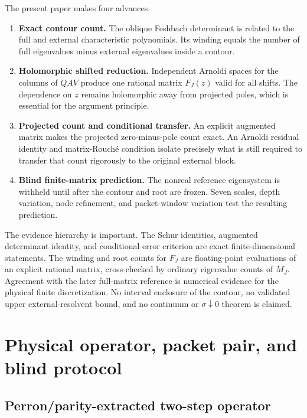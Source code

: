 \documentclass[11pt]{article}
\theoremstyle{definition}
\theoremstyle{remark}
\begin{document}
The present paper makes four advances.

\begin{enumerate}[label=\textbf{C\arabic*.},leftmargin=2.8em]
 \item \textbf{Exact contour count.}  The oblique Feshbach determinant is
 related to the full and external characteristic polynomials.  Its winding
 equals the number of full eigenvalues minus external eigenvalues inside a
 contour.
 \item \textbf{Holomorphic shifted reduction.}  Independent Arnoldi spaces
 for the columns of $QAV$ produce one rational matrix $F_J(z)$ valid for all
 shifts.  The dependence on $z$ remains holomorphic away from projected
 poles, which is essential for the argument principle.
 \item \textbf{Projected count and conditional transfer.}  An explicit
 augmented matrix makes the projected zero-minus-pole count exact.  An
 Arnoldi residual identity and matrix-Rouch\'e condition isolate precisely
 what is still required to transfer that count rigorously to the original
 external block.
 \item \textbf{Blind finite-matrix prediction.}  The nonreal reference
 eigensystem is withheld until after the contour and root are frozen.  Seven
 scales, depth variation, node refinement, and packet-window variation test
 the resulting prediction.
\end{enumerate}

The evidence hierarchy is important.  The Schur identities, augmented
determinant identity, and conditional error criterion are exact
finite-dimensional statements.  The winding and root counts for $F_J$ are
floating-point evaluations of an explicit rational matrix, cross-checked by
ordinary eigenvalue counts of $M_J$.  Agreement with the later full-matrix
reference is numerical evidence for the physical finite discretization.
No interval enclosure of the contour, no validated upper external-resolvent
bound, and no continuum or $\sigma\downarrow0$ theorem is claimed.

\section{Physical operator, packet pair, and blind protocol}
\label{sec:physical}

\subsection{Perron/parity-extracted two-step operator}
\end{document}
